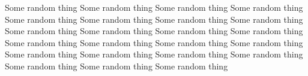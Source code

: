\noindent



\vspace{0.5in}

\noindent
Some random thing Some random thing Some random thing Some random thing Some random thing Some random thing Some random thing Some random thing Some random thing Some random thing Some random thing Some random thing Some random thing Some random thing Some random thing Some random thing Some random thing Some random thing Some random thing Some random thing Some random thing Some random thing Some random thing  